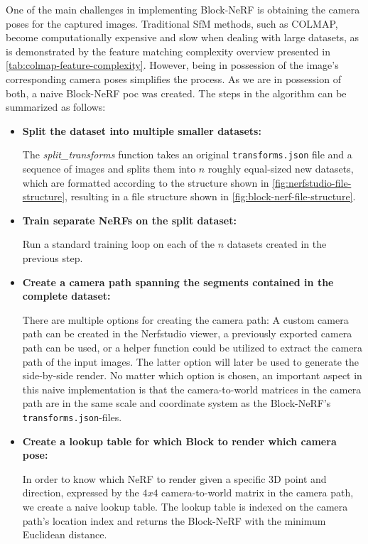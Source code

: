One of the main challenges in implementing Block-NeRF is obtaining the camera poses for the captured images. Traditional SfM methods, such as COLMAP, become computationally expensive and slow when dealing with large datasets, as is demonstrated by the feature matching complexity overview presented in  \autoref{tab:colmap-feature-complexity}. However, being in possession of the image's corresponding camera poses simplifies the process. As we are in possession of both, a naive Block-NeRF \acrshort{poc} was created. The steps in the algorithm can be summarized as follows:

\begin{itemize}
    \item \textbf{Split the dataset into multiple smaller datasets:} 

    The \textit{split\_transforms} function takes an original \texttt{transforms.json} file and a sequence of images and splits them into $n$ roughly equal-sized new datasets, which are formatted according to the structure shown in \autoref{fig:nerfstudio-file-structure}, resulting in a file structure shown in \autoref{fig:block-nerf-file-structure}.

    \item \textbf{Train separate NeRFs on the split dataset:} 

    Run a standard training loop on each of the $n$ datasets created in the previous step.
    
    \item \textbf{Create a camera path spanning the segments contained in the complete dataset:}
    
    There are multiple options for creating the camera path: A custom camera path can be created in the Nerfstudio viewer, a previously exported camera path can be used, or a helper function could be utilized to extract the camera path of the input images. The latter option will later be used to generate the side-by-side render. No matter which option is chosen, an important aspect in this naive implementation is that the camera-to-world matrices in the camera path are in the same scale and coordinate system as the Block-NeRF's \texttt{transforms.json}-files.
    
    \item \textbf{Create a lookup table for which Block to render which camera pose:}

    In order to know which NeRF to render given a specific 3D point and direction, expressed by the $4x4$ camera-to-world matrix in the camera path, we create a naive lookup table. The lookup table is indexed on the camera path's location index and returns the Block-NeRF with the minimum Euclidean distance.


\end{itemize}
